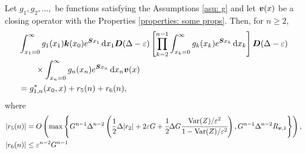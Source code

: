 \begin{lem}\label{lem: lst convergence}
	Let \(g_1,g_2,\dots,\) be functions satisfying the Assumptions \ref{asu: g} and let \(\boldsymbol v(x)\) be a closing operator with the Properties \ref{properties: some props}. Then, for \(n\geq 2\),  
	\begin{align}
		&\int_{x_1=0}^\infty g_1(x_1) \boldsymbol k(x_0) e^{\boldsymbol{S}x_1}\, \mathrm{d} x_1 \boldsymbol D(\Delta-\varepsilon)
            	\left[\prod_{k=2}^{n-1}\int_{x_k=0}^\infty g_k(x_k) e^{\boldsymbol{S}x_k} \, \mathrm{d} x_k \right]
		\boldsymbol D(\Delta-\varepsilon) \nonumber 
		\\&\qquad\times\int_{x_n=0}^\infty g_{n}(x_n) e^{\boldsymbol{S}x_n} \, \mathrm{d} x_n {\boldsymbol v}(x) \nonumber 
		\\& =g^{*}_{1,n}(x_0,x) + r_5(n) + r_6(n), \label{eqn: rhs g 2}
	\end{align}
	where  
	\begin{align*}
		|r_5(n)|&= O\left(\max\left\{G^{n-1}\Delta^{n-2}\left(\frac{1}{2}\Delta|r_2 |+ 2\varepsilon G 
		+ \cfrac{1}{2}\Delta G\cfrac{\mathrm{Var}(Z)/\varepsilon^2}{1-\mathrm{Var}(Z)/\varepsilon^2}\right),
		G^{n-1}\Delta^{n-2}R_{{\boldsymbol v},1}\right\}\right),
		\\|r_6(n)| &\leq \varepsilon^{n-2}G^{n-1}
	\end{align*}
\end{lem}
